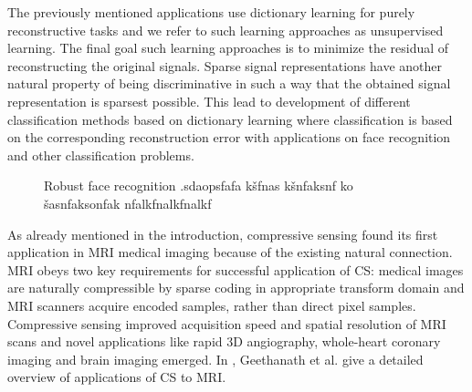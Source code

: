 \documentclass[journal]{IEEEtran}
\begin{document}
The previously mentioned applications use dictionary learning for purely reconstructive tasks and we refer to such learning approaches as unsupervised learning. The final goal such learning approaches is to minimize the residual of reconstructing the original signals. Sparse signal representations have another natural property of being discriminative in such a way that the obtained signal representation is sparsest possible. This lead to development of different classification methods based on dictionary learning where classification is based on the corresponding reconstruction error \cite{Zhang2010, ZhuolinJiang2013} with applications on face recognition \cite{Wright2009_src} and other classification problems.
%
\begin{figure}
	\centering
	
	\label{fig:face_recognition}
	
	\caption{Robust face recognition .sdaopsfafa kšfnas kšnfaksnf ko šasnfaksonfak nfalkfnalkfnalkf}
\end{figure}

As already mentioned in the introduction, compressive sensing found its first application in MRI medical imaging because of the existing natural connection. MRI obeys two key requirements for successful application of CS: medical images are naturally compressible by sparse coding in appropriate transform domain and MRI scanners acquire encoded samples, rather than direct pixel samples. Compressive sensing improved acquisition speed and spatial resolution of MRI scans and novel applications like rapid 3D angiography, whole-heart coronary imaging and brain imaging emerged. In \cite{Geethanath2013}, Geethanath et al. give a detailed overview of applications of CS to MRI.
\end{document}
